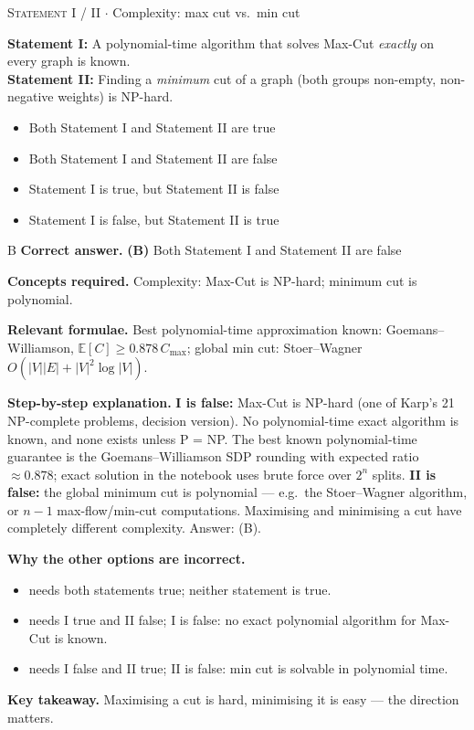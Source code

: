 \documentclass[11pt,a4paper]{article}
\newcommand{\optlabel}[1]{\textbf{(#1)}}
\newcommand{\correctlabel}[1]{\textcolor{okgreen}{\textbf{(#1)}\,\ding{51}}}
\newenvironment{qitem}[1]{\begin{list}{}{\setlength{\leftmargin}{3.3em}\setlength{\labelwidth}{3.1em}%
  \setlength{\labelsep}{0.2em}\setlength{\topsep}{3pt}\setlength{\parsep}{3pt}}\item[\textbf{Q.#1}\hfill]}{\end{list}}
\newcommand{\qsep}{\par\vspace{2pt}{\color{black!15}\hrule}\vspace{4pt}}
\newcommand{\qmeta}[2]{{\footnotesize\color{black!60}\textsc{#1} \;$\cdot$\; #2}\par}
\begin{document}
\begin{qitem}{8}
\qmeta{Statement I / II}{Complexity: max cut vs.\ min cut}
\textbf{Statement I:} A polynomial-time algorithm that solves Max-Cut \emph{exactly} on every graph is known.\\[1mm]
\textbf{Statement II:} Finding a \emph{minimum} cut of a graph (both groups non-empty, non-negative weights) is NP-hard.
\begin{itemize}[leftmargin=2.6em, labelsep=0.4em, itemsep=2pt, topsep=3pt]
\item[\optlabel{A}] Both Statement I and Statement II are true
\item[\correctlabel{B}] Both Statement I and Statement II are false
\item[\optlabel{C}] Statement I is true, but Statement II is false
\item[\optlabel{D}] Statement I is false, but Statement II is true
\end{itemize}
\end{qitem}
\begin{solbox}{B}
\textbf{\color{brand}Correct answer.} \textcolor{okgreen}{\textbf{(B)}} Both Statement I and Statement II are false

\textbf{\color{brand}Concepts required.} Complexity: Max-Cut is NP-hard; minimum cut is polynomial.

\textbf{\color{brand}Relevant formulae.} Best polynomial-time approximation known: Goemans--Williamson, $\mathbb E[C] \ge 0.878\,C_{\max}$; global min cut: Stoer--Wagner $O(|V||E| + |V|^2\log|V|)$.

\textbf{\color{brand}Step-by-step explanation.} \textbf{I is false:} Max-Cut is NP-hard (one of Karp's 21 NP-complete problems, decision version). No
polynomial-time exact algorithm is known, and none exists unless P = NP. The best known polynomial-time guarantee is the
Goemans--Williamson SDP rounding with expected ratio $\approx 0.878$; exact solution in the notebook uses brute force over $2^n$ splits.
\textbf{II is false:} the global minimum cut is polynomial --- e.g.\ the Stoer--Wagner algorithm, or $n-1$ max-flow/min-cut
computations. Maximising and minimising a cut have completely different complexity. Answer: (B).

\textbf{\color{brand}Why the other options are incorrect.}
\begin{itemize}[leftmargin=2.4em, itemsep=1pt, topsep=2pt]
\item[\textbf{(A)}] needs both statements true; neither statement is true.
\item[\textbf{(C)}] needs I true and II false; I is false: no exact polynomial algorithm for Max-Cut is known.
\item[\textbf{(D)}] needs I false and II true; II is false: min cut is solvable in polynomial time.
\end{itemize}
\textbf{\color{brand}Key takeaway.} Maximising a cut is hard, minimising it is easy --- the direction matters.
\end{solbox}
\qsep
\end{document}
